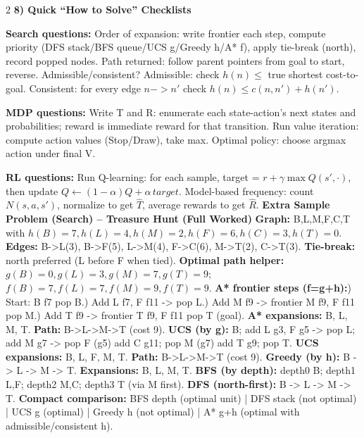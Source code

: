 \documentclass[10pt]{article}
\begin{document}
\begin{multicols*}{2}
\textbf{8) Quick ``How to Solve'' Checklists}

\textbf{Search questions:}\newline
Order of expansion: write frontier each step, compute priority (DFS stack/BFS queue/UCS g/Greedy h/A* f), apply tie-break (north), record popped nodes.\newline
Path returned: follow parent pointers from goal to start, reverse.\newline
Admissible/consistent? Admissible: check $h(n) \le$ true shortest cost-to-goal. Consistent: for every edge $n->n'$ check $h(n) \le c(n,n') + h(n')$.

\textbf{MDP questions:}\newline
Write T and R: enumerate each state-action's next states and probabilities; reward is immediate reward for that transition.\newline
Run value iteration: compute action values (Stop/Draw), take max.\newline
Optimal policy: choose argmax action under final V.

\textbf{RL questions:}\newline
Run Q-learning: for each sample, target = $r + \gamma \max Q(s',\cdot)$, then update $Q \leftarrow (1-\alpha)Q + \alpha\,target$.\newline
Model-based frequency: count $N(s,a,s')$, normalize to get $\hat{T}$, average rewards to get $\hat{R}$.\newline
\textbf{Extra Sample Problem (Search) -- Treasure Hunt (Full Worked)}\newline
\textbf{Graph:} B,L,M,F,C,T with $h(B)=7,h(L)=4,h(M)=2,h(F)=6,h(C)=3,h(T)=0$.\newline
\textbf{Edges:} B->L(3), B->F(5), L->M(4), F->C(6), M->T(2), C->T(3).\newline
\textbf{Tie-break:} north preferred (L before F when tied).
\textbf{Optimal path helper:} $g(B)=0,g(L)=3,g(M)=7,g(T)=9$; $f(B)=7,f(L)=7,f(M)=9,f(T)=9$.
\textbf{A* frontier steps (f=g+h):}) Start: {B f7} pop B.) Add L f7, F f11 -> pop L.) Add M f9 -> frontier {M f9, F f11} pop M.) Add T f9 -> frontier {T f9, F f11} pop T (goal).\newline
\textbf{A* expansions:} B, L, M, T. \textbf{Path:} B->L->M->T (cost 9).
\textbf{UCS (by g):}\newline
B; add L g3, F g5 -> pop L; add M g7 -> pop F (g5) add C g11; pop M (g7) add T g9; pop T.\newline
\textbf{UCS expansions:} B, L, F, M, T. \textbf{Path:} B->L->M->T (cost 9).
\textbf{Greedy (by h):} B -> L -> M -> T. \textbf{Expansions:} B, L, M, T.
\textbf{BFS (by depth):} depth0 B; depth1 L,F; depth2 M,C; depth3 T (via M first).\newline
\textbf{DFS (north-first):} B -> L -> M -> T.
\textbf{Compact comparison:}\newline
BFS depth (optimal unit) | DFS stack (not optimal) | UCS g (optimal) | Greedy h (not optimal) | A* g+h (optimal with admissible/consistent h).

\end{multicols*}
\end{document}
